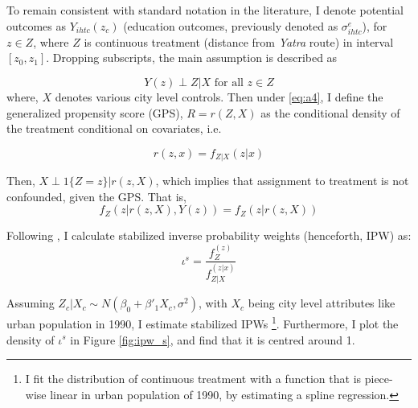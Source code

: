 \documentclass{article}
\begin{document}
To remain consistent with standard notation in the literature, I denote potential outcomes as $Y_{ihtc}(z_c)$ (education outcomes, previously denoted as $\sigma_{ihtc}^e$), for $z \in Z$, where $Z$ is continuous treatment (distance from \textit{Yatra} route) in interval $[z_0, z_1]$. Dropping subscripts, the main assumption is described as

\begin{equation}\label{eq:a4} \tag{A4}
    Y(z) \perp Z | X \textrm{ for all } z \in Z
\end{equation}
where, $X$ denotes various city level controls. Then under \eqref{eq:a4}, I define the generalized propensity score (GPS), $R = r(Z, X)$ as the conditional density of the treatment conditional on covariates, i.e.

\begin{equation}
    r(z, x) = f_{Z | X} (z | x)
\end{equation}

Then, $X \perp 1\{Z = z\} | r(z, X)$, which implies that assignment to treatment is not confounded, given the GPS. That is,
$$f_Z(z|r(z, X), Y(z)) = f_Z(z | r(z, X))$$

Following \cite{robins2000marginal}, I calculate stabilized inverse probability weights (henceforth, IPW) as:
\begin{equation}
    \iota^s = \frac{f_Z^{(z)}}{f_{Z | X}^{(z | x)}}
\end{equation}

Assuming $Z_c | X_c \sim N(\beta_0 + \beta'_1 X_c, \sigma^2)$, with $X_c$ being city level attributes like urban population in 1990,  I estimate stabilized IPWs \footnote{I fit the distribution of continuous treatment with a function that is piece-wise linear in urban population of 1990, by estimating a spline regression.}. Furthermore, I plot the density of $\iota^s$ in Figure \ref{fig:ipw_s}, and find that it is centred around 1.  
\end{document}
